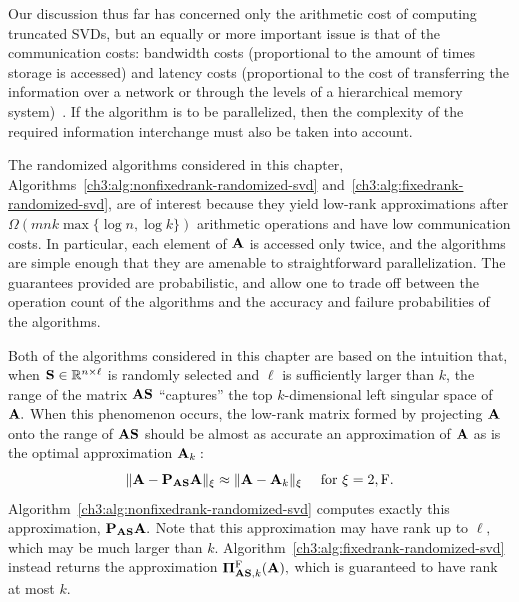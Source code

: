 Our discussion thus far has concerned only the arithmetic cost of computing
truncated SVDs, but an equally or more important issue is that of the communication
costs: bandwidth costs (proportional to the amount of times storage is accessed)
and latency costs (proportional to the cost of transferring the information
over a network or through the levels of a hierarchical memory system)~\cite{BDHS11}.
If the algorithm is to be parallelized, then the complexity of the required
information interchange must also be taken into account.

The randomized algorithms considered in this chapter, 
Algorithms~\ref{ch3:alg:nonfixedrank-randomized-svd} and~\ref{ch3:alg:fixedrank-randomized-svd},
are of interest because they
yield low-rank approximations after $\Omega(mn k \max\{\log n, \log k\})$ arithmetic
operations and have low communication costs. In particular, each element of 
$\mathbf{A}$ is accessed only twice, and the algorithms are simple enough that they
are amenable to straightforward parallelization. The guarantees provided
are probabilistic, and allow one to trade off between the operation count
of the algorithms and the accuracy and failure probabilities of the algorithms.

Both of the algorithms considered in this chapter are based on the intuition
that, when $\mathbf{S} \in \mathbb{R}^{n \times \ell}$ is randomly selected and $\ell$ is
sufficiently larger than $k$, the range of the matrix $\mathbf{A}\mathbf{S}$
``captures'' the top $k$-dimensional left singular space of $\mathbf{A}.$ When this
phenomenon occurs, the low-rank matrix formed by projecting $\mathbf{A}$ onto
the range of $\mathbf{A}\mathbf{S}$ should be almost as accurate an approximation of 
$\mathbf{A}$ as is the optimal approximation $\mathbf{A}_k:$
\[
 \mbox{}\|\mathbf{A} - \mathbf{P}_{\mathbf{A}\mathbf{S}} \mathbf{A}\|_{\xi} \approx \mbox{}\|\mathbf{A} - \mathbf{A}_k\|_{\xi} 
 \quad \text{ for } \xi=2,\mathrm{F}.
\]
Algorithm~\ref{ch3:alg:nonfixedrank-randomized-svd} computes exactly this 
approximation, $\mathbf{P}_{\mathbf{A}\mathbf{S}} \mathbf{A}.$ Note that this
approximation may have rank up to $\ell,$ which may be much larger than
$k.$ Algorithm~\ref{ch3:alg:fixedrank-randomized-svd} instead returns the approximation
$\boldsymbol{\Pi}_{\mathbf{A}\mathbf{S}, k}^{\mathrm{F}}(\mathbf{A}),$ which is guaranteed to have 
rank at most $k.$

